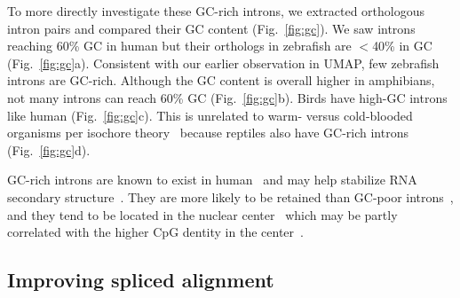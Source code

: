 \documentclass[webpdf,contemporary,large,namedate]{oup-authoring-template}%
\begin{document}
To more directly investigate these GC-rich introns,
we extracted orthologous intron pairs and compared their GC content (Fig.~\ref{fig:gc}).
We saw introns reaching 60\% GC in human but their orthologs in zebrafish are $<$40\% in GC (Fig.~\ref{fig:gc}a).
Consistent with our earlier observation in UMAP, few zebrafish introns are GC-rich.
Although the GC content is overall higher in amphibians, not many introns can reach 60\% GC (Fig.~\ref{fig:gc}b).
Birds have high-GC introns like human (Fig.~\ref{fig:gc}c).
This is unrelated to warm- versus cold-blooded organisms per isochore theory~\citep{Bernardi:1985aa}
because reptiles also have GC-rich introns (Fig.~\ref{fig:gc}d).


GC-rich introns are known to exist in human~\citep{Wang:2011aa}
and may help stabilize RNA secondary structure~\citep{Zhang:2011aa}.
They are more likely to be retained than GC-poor introns~\citep{Sibley:2016vh},
and they tend to be located in the nuclear center~\citep{Choquet:2025aa}
which may be partly correlated with the higher CpG dentity in the center~\citep{Xie:2017aa,Tan:2018aa}.

\subsection{Improving spliced alignment}
\end{document}

